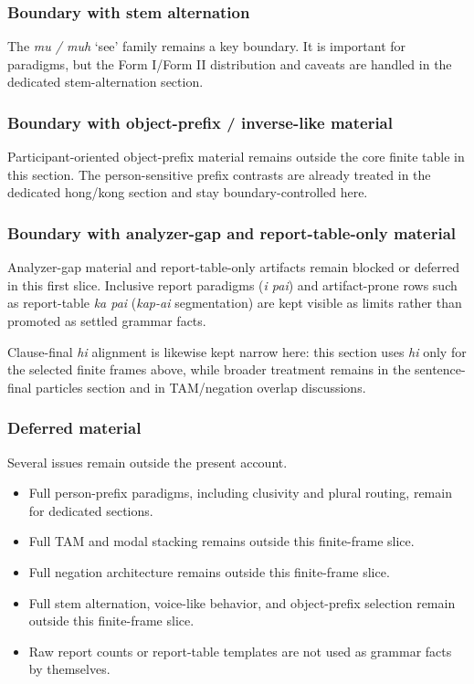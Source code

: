 \documentclass[
  11pt,
  a4paper,
]{article}
\providecommand{\tightlist}{%
  \setlength{\itemsep}{0pt}\setlength{\parskip}{0pt}}
\newcommand{\tdim}[1]{\textit{#1}}
\newcommand{\glossquote}[1]{`#1'}
\begin{document}
\subsubsection{Boundary with stem
alternation}\label{boundary-with-stem-alternation}

The \tdim{mu / muh} \glossquote{see} family remains a key boundary. It
is important for paradigms, but the Form I/Form II distribution and
caveats are handled in the dedicated stem-alternation section.

\subsubsection{Boundary with object-prefix / inverse-like
material}\label{boundary-with-object-prefix-inverse-like-material}

Participant-oriented object-prefix material remains outside the core
finite table in this section. The person-sensitive prefix contrasts are
already treated in the dedicated hong/kong section and stay
boundary-controlled here.

\subsubsection{Boundary with analyzer-gap and report-table-only
material}\label{boundary-with-analyzer-gap-and-report-table-only-material}

Analyzer-gap material and report-table-only artifacts remain blocked or
deferred in this first slice. Inclusive report paradigms (\tdim{i pai})
and artifact-prone rows such as report-table \tdim{ka pai}
(\tdim{kap-ai} segmentation) are kept visible as limits rather than
promoted as settled grammar facts.

Clause-final \tdim{hi} alignment is likewise kept narrow here: this
section uses \tdim{hi} only for the selected finite frames above, while
broader treatment remains in the sentence-final particles section and in
TAM/negation overlap discussions.

\subsubsection{Deferred material}\label{deferred-material-5}

Several issues remain outside the present account.

\begin{itemize}
\tightlist
\item
  Full person-prefix paradigms, including clusivity and plural routing,
  remain for dedicated sections.
\item
  Full TAM and modal stacking remains outside this finite-frame slice.
\item
  Full negation architecture remains outside this finite-frame slice.
\item
  Full stem alternation, voice-like behavior, and object-prefix
  selection remain outside this finite-frame slice.
\item
  Raw report counts or report-table templates are not used as grammar
  facts by themselves.
\end{itemize}
\end{document}
